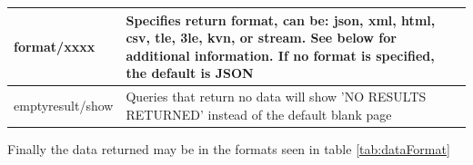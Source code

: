 \documentclass[12pt]{article}
\begin{document}
\begin{table}[H]
\begin{tabular}{|p{4cm}|p{11.5cm}|}
		format/xxxx                    & Specifies return format, can be: json, xml, html, csv, tle, 3le, kvn, or stream. See below for additional information. If no format is specified, the default is JSON                                                                                                      \\ \hline
		emptyresult/show               & Queries that return no data will show 'NO RESULTS RETURNED' instead of the default blank page                                                                                                                                                                              \\ \hline
	\end{tabular}
\end{table}\doublespacing


Finally the data returned may be in the formats seen in table \ref{tab:dataFormat}
\end{document}
